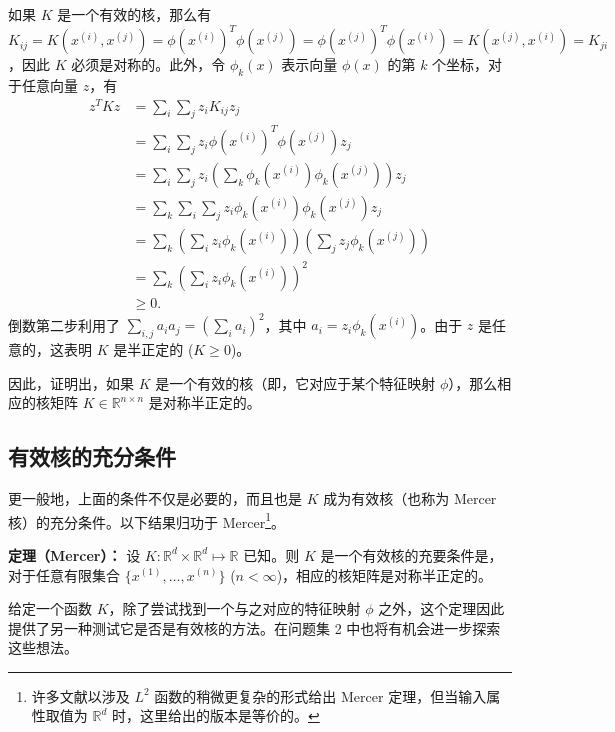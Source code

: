 如果 $K$ 是一个有效的核，那么有 $K_{ij} = K(x^{(i)}, x^{(j)}) = \phi(x^{(i)})^T \phi(x^{(j)}) = \phi(x^{(j)})^T \phi(x^{(i)}) = K(x^{(j)}, x^{(i)}) = K_{ji}$，因此 $K$ 必须是对称的。此外，令 $\phi_k(x)$ 表示向量 $\phi(x)$ 的第 $k$ 个坐标，对于任意向量 $z$，有
\begin{align*} 
    z^T K z &= \sum_i \sum_j z_i K_{ij} z_j \\ 
    &= \sum_i \sum_j z_i \phi(x^{(i)})^T \phi(x^{(j)}) z_j \\ 
    &= \sum_i \sum_j z_i \left( \sum_k \phi_k(x^{(i)}) \phi_k(x^{(j)}) \right) z_j \\ 
    &= \sum_k \sum_i \sum_j z_i \phi_k(x^{(i)}) \phi_k(x^{(j)}) z_j \\ 
    &= \sum_k \left( \sum_i z_i \phi_k(x^{(i)}) \right) \left( \sum_j z_j \phi_k(x^{(j)}) \right) \\ 
    &= \sum_k \left( \sum_i z_i \phi_k(x^{(i)}) \right)^2 \\ 
    &\ge 0. 
\end{align*}
倒数第二步利用了 $\sum_{i,j} a_i a_j = (\sum_i a_i)^2$，其中 $a_i = z_i \phi_k(x^{(i)})$。由于 $z$ 是任意的，这表明 $K$ 是半正定的 ($K \ge 0$)。

因此，证明出，如果 $K$ 是一个有效的核（即，它对应于某个特征映射 $\phi$），那么相应的核矩阵 $K \in \mathbb{R}^{n \times n}$ 是对称半正定的。

\subsection*{有效核的充分条件}

更一般地，上面的条件不仅是必要的，而且也是 $K$ 成为有效核（也称为 Mercer 核）的充分条件。以下结果归功于 Mercer\footnote{许多文献以涉及 $L^2$ 函数的稍微更复杂的形式给出 Mercer 定理，但当输入属性取值为 $\mathbb{R}^d$ 时，这里给出的版本是等价的。}。

\noindent\textbf{定理（Mercer）：} 设 $K: \mathbb{R}^d \times \mathbb{R}^d \mapsto \mathbb{R}$ 已知。则 $K$ 是一个有效核的充要条件是，对于任意有限集合 $\{x^{(1)}, \dots, x^{(n)}\}$ ($n < \infty$)，相应的核矩阵是对称半正定的。

给定一个函数 $K$，除了尝试找到一个与之对应的特征映射 $\phi$ 之外，这个定理因此提供了另一种测试它是否是有效核的方法。在问题集 2 中也将有机会进一步探索这些想法。


